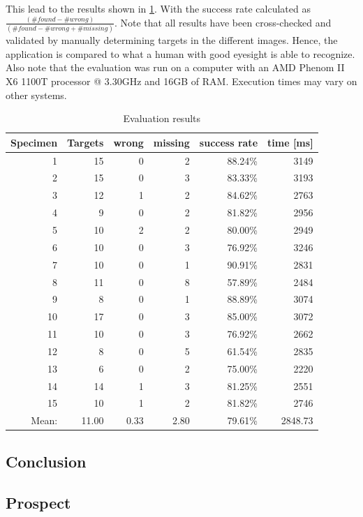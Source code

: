 \documentclass[a4paper, 12pt]{article}
\begin{document}
This lead to the results shown in \ref{tab:evaluation}. With the success rate
calculated as $\frac{(\#found - \#wrong)}{(\#found - \#wrong + \#missing)}$.
Note that all results have been cross-checked and validated by manually
determining targets in the different images. Hence, the application is compared
to what a human with good eyesight is able to recognize. Also note that the
evaluation was run on a computer with an AMD Phenom II X6 1100T processor @
3.30GHz and 16GB of RAM. Execution times may vary on other systems.

\begin{table}[h]
\centering
\begin{tabular} {r | r | r | r | r | r}
Specimen & Targets & wrong & missing & success rate & time [ms]\\
\hline
1 & 15 & 0 & 2 & 88.24\% & 3149\\
2 & 15 & 0 & 3 & 83.33\% & 3193\\
3 & 12 & 1 & 2 & 84.62\% & 2763\\
4 & 9 & 0 & 2 & 81.82\% & 2956\\
5 & 10 & 2 & 2 & 80.00\% & 2949\\
6 & 10 & 0 & 3 & 76.92\% & 3246\\
7 & 10 & 0 & 1 & 90.91\% & 2831\\
8 & 11 & 0 & 8 & 57.89\% & 2484\\
9 & 8 & 0 & 1 & 88.89\% & 3074\\
10 & 17 & 0 & 3 & 85.00\% & 3072\\
11 & 10 & 0 & 3 & 76.92\% & 2662\\
12 & 8 & 0 & 5 & 61.54\% & 2835\\
13 & 6 & 0 & 2 & 75.00\% & 2220\\
14 & 14 & 1 & 3 & 81.25\% & 2551\\
15 & 10 & 1 & 2 & 81.82\% & 2746\\
\hline
Mean: & 11.00 & 0.33 & 2.80 & 79.61\% & 2848.73\\
\end{tabular}
\caption{Evaluation results}
\label{tab:evaluation}
\end{table}

\subsection{Conclusion}


\subsection{Prospect}

\newpage
{}

\end{document}
